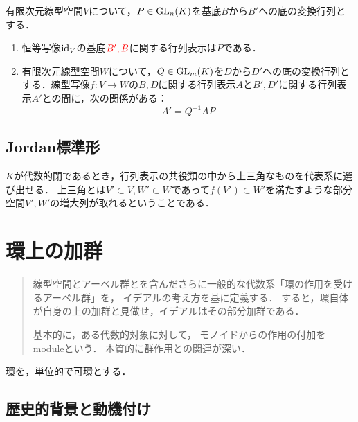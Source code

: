 \documentclass[uplatex,dvipdfmx]{jsreport}
\begin{document}
\begin{proposition}[底の変換行列の特徴づけ]\label{prop-transformation-matrix}
    有限次元線型空間$V$について，$P\in\mathrm{GL}_n(K)$を基底$B$から$B'$への底の変換行列とする．
    \begin{enumerate}
        \item 恒等写像$\mathrm{id}_V$の基底$\textcolor{red}{B',B}$に関する行列表示は$P$である．
        \item 有限次元線型空間$W$について，$Q\in\mathrm{GL}_m(K)$を$D$から$D'$への底の変換行列とする．線型写像$f:V\to W$の$B,D$に関する行列表示$A$と$B',D'$に関する行列表示$A'$との間に，次の関係がある：
        \[A'=Q^{-1}AP\]
    \end{enumerate}
\end{proposition}

\section{Jordan標準形}

\begin{tcolorbox}[colframe=ForestGreen, colback=ForestGreen!10!white,breakable,colbacktitle=ForestGreen!40!white,coltitle=black,fonttitle=\bfseries\sffamily,
title=]
    $K$が代数的閉であるとき，行列表示の共役類の中から上三角なものを代表系に選び出せる．
    上三角とは$V'\subset V,W'\subset W$であって$f(V')\subset W'$を満たすような部分空間$V',W'$の増大列が取れるということである．
\end{tcolorbox}

\chapter{環上の加群}

\begin{quotation}
    線型空間とアーベル群とを含んださらに一般的な代数系「環の作用を受けるアーベル群」を，
    イデアルの考え方を基に定義する．
    すると，環自体が自身の上の加群と見做せ，イデアルはその部分加群である．
    
    基本的に，ある代数的対象に対して，
    モノイドからの作用の付加をmoduleという．
    本質的に群作用との関連が深い．
\end{quotation}

\begin{notation*}
    環を，単位的で可環とする．
\end{notation*}

\section{歴史的背景と動機付け}
\end{document}
